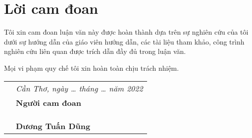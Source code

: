 \chapter*{Lời cam đoan}
Tôi xin cam đoan luận văn này được hoàn thành dựa trên sự nghiên cứu của tôi dưới sự hướng dẫn của giáo viên hướng dẫn, các tài liệu tham khảo, công trình nghiên cứu liên quan được trích dẫn đầy đủ trong luận văn.

Mọi vi phạm quy chế tôi xin hoàn toàn chịu trách nhiệm.

\begin{table}[h]
  \begin{tabular}{ p{7cm}  p{8cm} }
                                   & \emph{Cần Thơ, ngày \ldots{ } tháng \ldots{ } năm 2022}\\
									& \hspace{22mm}\textbf{Người cam đoan}\\
									& \\
									& \\
									& \\
									&\hspace{2cm}\textbf{Dương Tuấn Dũng}\\
                                    
\end{tabular}
\end{table}
